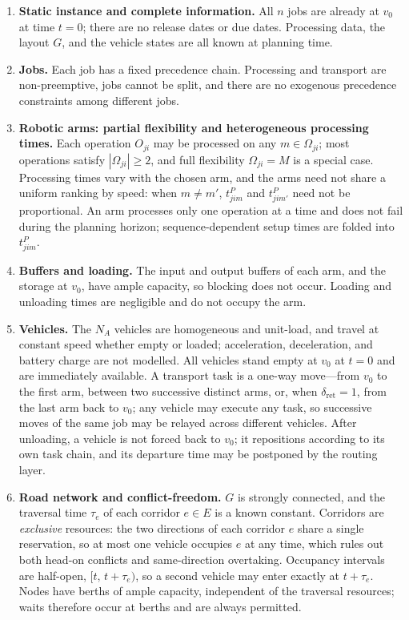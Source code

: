 \documentclass[manuscript,screen,review]{acmart}
\begin{document}
\begin{enumerate}[label=\textbf{A\arabic*.},leftmargin=*,topsep=2pt,itemsep=2pt]
\item \textbf{Static instance and complete information.} All $n$ jobs are already at $v_0$ at time $t=0$; there are no release dates or due dates. Processing data, the layout $G$, and the vehicle states are all known at planning time.

\item \textbf{Jobs.} Each job has a fixed precedence chain. Processing and transport are non-preemptive, jobs cannot be split,
and there are no exogenous precedence constraints among different jobs.

\item \textbf{Robotic arms: partial flexibility and heterogeneous processing times.} Each operation $O_{ji}$ may be processed on any
$m\in\Omega_{ji}$; most operations satisfy $|\Omega_{ji}|\ge 2$, and full flexibility
$\Omega_{ji}=M$ is a special case. Processing times vary with the chosen arm, and the arms need not share a uniform ranking by speed: when
$m\neq m'$, $t^P_{jim}$ and $t^P_{jim'}$ need not be proportional. An arm processes only
one operation at a time and does not fail during the planning horizon; sequence-dependent setup times are folded into $t^P_{jim}$.

\item \textbf{Buffers and loading.} The input and output buffers of each arm, and the storage at $v_0$, have ample capacity,
so blocking does not occur. Loading and unloading times are negligible and do not occupy the arm.

\item \textbf{Vehicles.} The $N_A$ vehicles are homogeneous and unit-load, and travel at constant speed whether empty or loaded; acceleration, deceleration, and
battery charge are not modelled. All vehicles stand empty at $v_0$ at $t=0$ and are immediately available. A transport task is a one-way move---from $v_0$
to the first arm, between two successive distinct arms, or, when $\delta_{\mathrm{ret}}=1$, from the last arm
back to $v_0$; any vehicle may execute any task,
so successive moves of the same job may be relayed across different vehicles. After unloading, a vehicle is not forced back to $v_0$; it
repositions according to its own task chain, and its departure time may be postponed by the routing layer.

\item \textbf{Road network and conflict-freedom.} $G$ is strongly connected, and the traversal time $\tau_e$ of each corridor $e\in E$ is a known constant. Corridors are
\emph{exclusive} resources: the two directions of each corridor $e$ share a single reservation, so at most one vehicle occupies $e$ at any time, which rules out
both head-on conflicts and same-direction overtaking. Occupancy intervals are half-open, $[t,\,t+\tau_e)$, so a second vehicle may enter exactly at
$t+\tau_e$. Nodes have berths of ample capacity, independent of the traversal resources; waits therefore occur at berths
and are always permitted.


\end{enumerate}
\end{document}
